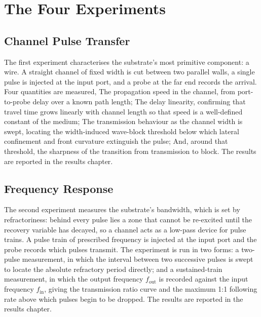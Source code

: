 \section{The Four Experiments}
\label{sec:meth_experiments}

\subsection{Channel Pulse Transfer}
\label{sec:meth_exp_channel}


The first experiment characterises the substrate's most primitive component: a wire. 
A straight channel of fixed width is cut between two parallel walls, a single pulse is injected at the input port, and a probe at the far end records the arrival. 
Four quantities are measured, The propagation speed in the channel, from port-to-probe delay over a known path length; 
The delay linearity, confirming that travel time grows linearly with channel length so that speed is a well-defined constant of the medium; 
The transmission behaviour as the channel width is swept, locating the width-induced wave-block threshold below which lateral confinement and front curvature extinguish the pulse; 
And, around that threshold, the sharpness of the transition from transmission to block. 
The results are reported in the results chapter. 

\subsection{Frequency Response}
\label{sec:meth_exp_frequency}

The second experiment measures the substrate's bandwidth, which is set by refractoriness: behind every pulse lies a zone that cannot be re-excited until the recovery variable has decayed, so a channel acts as a low-pass device for pulse trains. 
A pulse train of prescribed frequency is injected at the input port and the probe records which pulses transmit. 
The experiment is run in two forms: a two-pulse measurement, in which the interval between two successive pulses is swept to locate the absolute refractory period directly; and a sustained-train measurement, in which the output frequency $f_{\mathrm{out}}$ is recorded against the input frequency $f_{\mathrm{in}}$, giving the transmission ratio curve and the maximum 1:1 following rate above which pulses begin to be dropped. 
The results are reported in the results chapter. 

